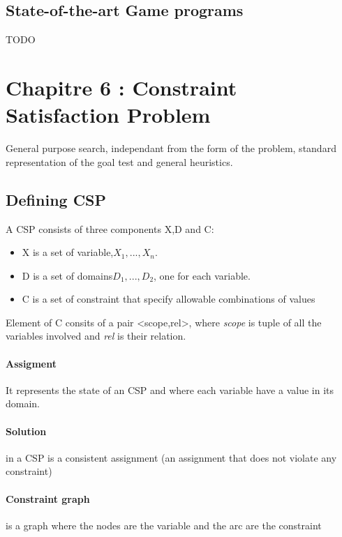 \subsection{State-of-the-art Game programs}
TODO%


\section{Chapitre 6 : Constraint Satisfaction Problem }
General purpose search, independant from the form of the problem, standard representation of the goal test and general heuristics.

\subsection{Defining CSP}
	A CSP consists of three components X,D and C:
	\begin{itemize}
		\item X is a set of variable,${X_1,...,X_n}$.
		\item D is a set of domains${D_1,...,D_2}$, one for each variable.
		\item C is a set of constraint that specify allowable combinations of values
	\end{itemize}

 Element of  C consits  of a pair  <scope,rel>, where  \textit{scope} is
 tuple of all the variables involved and \textit{rel} is their relation.

 \paragraph{Assigment} It represents the state  of an CSP and where each
variable have a value in its domain.

 \paragraph{Solution} in a CSP is a consistent assignment (an assignment
 that does not violate any constraint)

 \paragraph{Constraint  graph}  is  a  graph where  the  nodes  are  the
variable and the arc are the constraint

